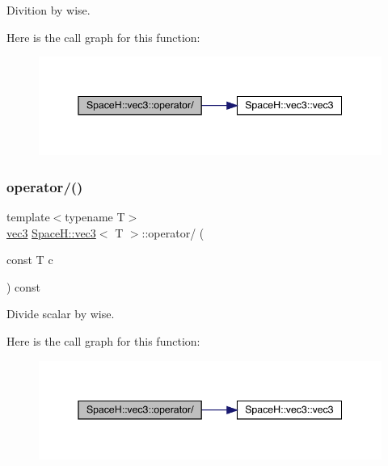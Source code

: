 Divition by wise. 

Here is the call graph for this function\+:
\nopagebreak
\begin{figure}[H]
\begin{center}
\leavevmode
\includegraphics[width=345pt]{struct_space_h_1_1vec3_ab9d46a10bb578ff6939ed9280cb12df8_cgraph}
\end{center}
\end{figure}
\mbox{\label{struct_space_h_1_1vec3_af3f90f3a0f92d6ee7bd8b413b14d2aaf}} 
\subsubsection{\texorpdfstring{operator/()}{operator/()}\hspace{0.1cm}{\footnotesize\ttfamily [5/7]}}
{\footnotesize\ttfamily template$<$typename T$>$ \\
\mbox{\hyperlink{struct_space_h_1_1vec3}{vec3}} \mbox{\hyperlink{struct_space_h_1_1vec3}{Space\+H\+::vec3}}$<$ T $>$\+::operator/ (\begin{DoxyParamCaption}\item[{const T}]{c }\end{DoxyParamCaption}) const\hspace{0.3cm}{\ttfamily [inline]}}



Divide scalar by wise. 

Here is the call graph for this function\+:
\nopagebreak
\begin{figure}[H]
\begin{center}
\leavevmode
\includegraphics[width=345pt]{struct_space_h_1_1vec3_af3f90f3a0f92d6ee7bd8b413b14d2aaf_cgraph}
\end{center}
\end{figure}
\mbox{\label{struct_space_h_1_1vec3_af3f90f3a0f92d6ee7bd8b413b14d2aaf}} 
